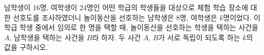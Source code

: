 남학생이 16명, 여학생이 24명인 어떤 학급의 학생들을 대상으로 체험 학습 장소에 대한 선호도를 조사하였더니 놀이동산을 선호하는 남학생은 8명, 여학생은 $k$명이었다. 이 학급 학생 중에서 임의로 한 명을 택할 때, 놀이동산을 선호하는 학생을 택하는 사건을 $A$, 남학생을 택하는 사건을 $B$라 하자. 두 사건 $A$, $B$가 서로 독립이 되도록 하는 $k$의 값을 구하시오.
